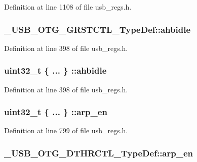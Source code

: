Definition at line 1108 of file usb\-\_\-regs.\-h.

\hypertarget{group___u_s_b___o_t_g___d_r_i_v_e_r_ga4247e798442e482943bbb22ed25cb1eb}{
\subsubsection[{ahbidle}]{ \-\_\-\-U\-S\-B\-\_\-\-O\-T\-G\-\_\-\-G\-R\-S\-T\-C\-T\-L\-\_\-\-Type\-Def\-::ahbidle}}\label{group___u_s_b___o_t_g___d_r_i_v_e_r_ga4247e798442e482943bbb22ed25cb1eb}


Definition at line 398 of file usb\-\_\-regs.\-h.

\hypertarget{group___u_s_b___o_t_g___d_r_i_v_e_r_gadb82cdb92c6bbe665e6fbde2ca9bf838}{
\subsubsection[{ahbidle}]{\setlength{\rightskip}{0pt plus 5cm}uint32\-\_\-t \{ ... \} \-::ahbidle}}\label{group___u_s_b___o_t_g___d_r_i_v_e_r_gadb82cdb92c6bbe665e6fbde2ca9bf838}


Definition at line 398 of file usb\-\_\-regs.\-h.

\hypertarget{group___u_s_b___o_t_g___d_r_i_v_e_r_ga87e78bd16f59527f75b8ba032a2544dc}{
\subsubsection[{arp\-\_\-en}]{\setlength{\rightskip}{0pt plus 5cm}uint32\-\_\-t \{ ... \} \-::arp\-\_\-en}}\label{group___u_s_b___o_t_g___d_r_i_v_e_r_ga87e78bd16f59527f75b8ba032a2544dc}


Definition at line 799 of file usb\-\_\-regs.\-h.

\hypertarget{group___u_s_b___o_t_g___d_r_i_v_e_r_gabb5b2edd6a3c01d382137065e1277feb}{
\subsubsection[{arp\-\_\-en}]{ \-\_\-\-U\-S\-B\-\_\-\-O\-T\-G\-\_\-\-D\-T\-H\-R\-C\-T\-L\-\_\-\-Type\-Def\-::arp\-\_\-en}}\label{group___u_s_b___o_t_g___d_r_i_v_e_r_gabb5b2edd6a3c01d382137065e1277feb}


